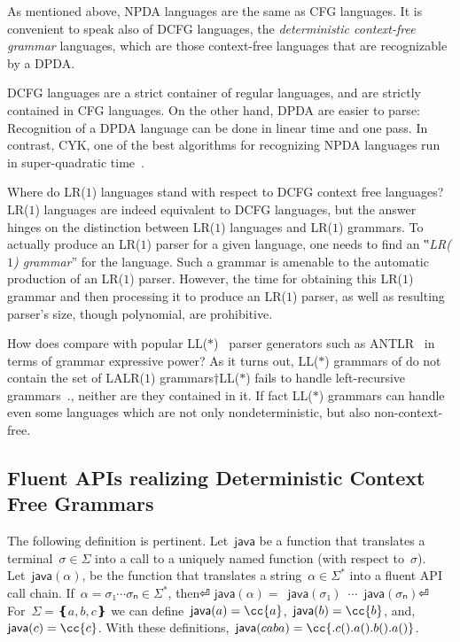 As mentioned above, NPDA languages are the same as CFG languages.
It is convenient to speak also of DCFG languages, the \emph{deterministic context-free grammar} languages,
which are those context-free languages that are recognizable by a DPDA.

DCFG languages are a strict container of regular languages,
  and are strictly contained in CFG languages.
On the other hand, DPDA are easier to parse:
  Recognition of a DPDA language
  can be done in linear time and one pass.
  In contrast, CYK, one of the best algorithms for recognizing NPDA languages run in super-quadratic time~\cite{Younger:1967,Cocke:1969,Earley:1970}.

Where do LR($1$) languages stand with respect to DCFG context free languages?
LR($1$) languages are indeed equivalent to DCFG languages, but
the answer hinges on the distinction
  between LR($1$) languages and LR($1$) grammars.
To actually produce an LR($1$) parser for a given language,
  one needs to find an ‟\emph{LR($1$) grammar}” for the language.
Such a grammar is amenable to
  the automatic production of an LR($1$) parser.
However, the time for obtaining this LR($1$) grammar and
  then processing it to produce an LR($1$) parser,
  as well as resulting parser's size,
  though polynomial, are prohibitive.

How does \Self compare
with popular LL($*$)~\cite{Parr:2011} parser generators such
  as ANTLR~\cite{Parr:1995}
in terms of grammar expressive power?
  As it turns out, LL($*$) grammars of do not contain the set
    of LALR($1$) grammars†{LL($*$) fails to handle left-recursive
    grammars~\cite{Parr:2011}.},
neither are they contained in it. 
If fact LL($*$) grammars
  can handle even some languages which are not only nondeterministic, 
   but also non-context-free.

\subsection{Fluent APIs realizing Deterministic Context Free Grammars}
The following definition is pertinent.
Let~$\textsf{java}$ be a function that translates a terminal~$σ∈Σ$
into a call to a uniquely named function (with respect to~$σ$).
Let~$\textsf{java}(α)$, be the function
  that translates a string~$α∈Σ^*$ into a fluent API call chain.
If~$α=σ₁⋯σₙ∈Σ^*$, then⏎
  \mbox{\qquad\qquad}$\textsf{java}(α)=$~$\textsf{java}(σ₁)$~$⋯$~$\textsf{java}(σₙ)$\cc{()}⏎
For~$Σ=❴a,b,c❵$ we can define~$\textsf{java}(a)=\cc{a}$,~$\textsf{java}(b)=\cc{b}$, and,~$\textsf{java}(c)=\cc{c}$.
With these definitions,~$\textsf{java}(caba) = \cc{.c().a().b().a()}$.

